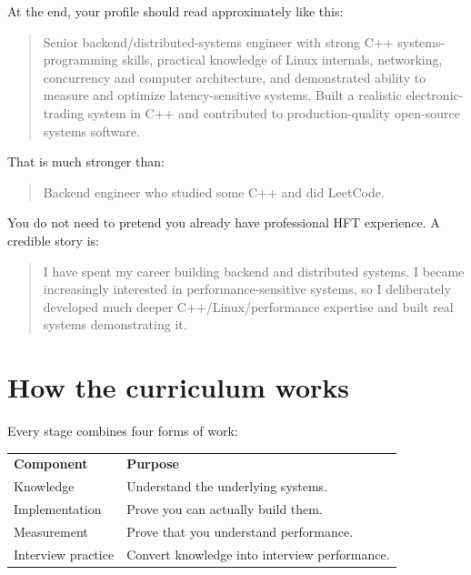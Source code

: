 \documentclass[11pt,letterpaper]{article}
\begin{document}
At the end, your profile should read approximately like this:

\begin{quote}
Senior backend/distributed-systems engineer with strong C++ systems-programming skills, practical knowledge of Linux internals, networking, concurrency and computer architecture, and demonstrated ability to measure and optimize latency-sensitive systems. Built a realistic electronic-trading system in C++ and contributed to production-quality open-source systems software.
\end{quote}

That is much stronger than:

\begin{quote}
Backend engineer who studied some C++ and did LeetCode.
\end{quote}

You do not need to pretend you already have professional HFT experience. A credible story is:

\begin{quote}
I have spent my career building backend and distributed systems. I became increasingly interested in performance-sensitive systems, so I deliberately developed much deeper C++/Linux/performance expertise and built real systems demonstrating it.
\end{quote}

\section{How the curriculum works}\label{sec:2}

Every stage combines four forms of work:

\begin{center}
\small
\begin{tabular}{>{\raggedright\arraybackslash}p{}>{\raggedright\arraybackslash}p{}}
\textbf{Component} & \textbf{Purpose} \\
Knowledge & Understand the underlying systems. \\
Implementation & Prove you can actually build them. \\
Measurement & Prove that you understand performance. \\
Interview practice & Convert knowledge into interview performance. \\
\end{tabular}
\end{center}
\end{document}
